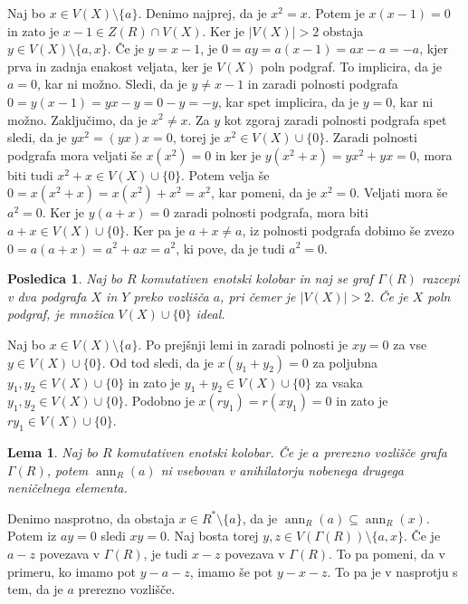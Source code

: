 \documentclass[a4paper, 12pt]{amsart}
\theoremstyle{definition} %
\theoremstyle{plain} %
\newtheorem{lema}[definicija]{Lema}
\newtheorem{posledica}[definicija]{Posledica}
\DeclareMathOperator{\ann}{ann}
\begin{document}
\proof
Naj bo $x\in V(X)\setminus \{a\}$. Denimo najprej, da je $x^2 = x$. Potem je $x(x-1) = 0$ in zato je $x-1\in Z(R) \cap V(X)$. Ker je $|V(X)|> 2$ obstaja $y\in V(X)\setminus \{a,x\}$. Če je $y = x-1$, je $0 = ay = a(x-1) = ax - a = -a$, kjer prva in zadnja enakost veljata, ker je $V(X)$ poln podgraf. To implicira, da je $a=0$, kar ni možno. Sledi, da je $y\neq x-1$ in zaradi polnosti podgrafa $0 = y(x-1) = yx-y = 0-y = -y$, kar spet implicira, da je $y=0$, kar ni možno. Zaključimo, da je $x^2 \neq x$. Za $y$ kot zgoraj zaradi polnosti podgrafa spet sledi, da je $yx^2 = (yx)x = 0$, torej je $x^2 \in V(X)\cup\{0\}$. Zaradi polnosti podgrafa mora veljati še $x(x^2)=0$ in ker je $y(x^2 + x ) = yx^2 + yx =0 $, mora biti tudi $x^2 + x\in V(X) \cup \{0\}$. Potem velja še  $0 = x(x^2 + x) = x(x^2) + x^2 = x^2$, kar pomeni, da je $x^2 = 0$. Veljati mora še $a^2 = 0$. Ker je $y(a+x) = 0 $ zaradi polnosti podgrafa, mora biti $a+x\in V(X) \cup\{0\}$. Ker pa je $a+x \neq a$, iz polnosti podgrafa dobimo še zvezo $0 = a(a+x) = a^2 + ax = a^2$, ki pove, da je tudi $a^2 = 0$.
\endproof

\begin{posledica}
Naj bo $R$ komutativen enotski kolobar in naj se graf $\Gamma(R)$ razcepi v dva podgrafa $X$ in $Y$ preko vozlišča $a$, pri čemer je $|V(X)|>2$. Če je $X$ poln podgraf, je množica $V(X)\cup \{0\}$ ideal.
\end{posledica}

\proof
Naj bo $x\in V(X)\setminus\{a\}$. Po prejšnji lemi in zaradi polnosti je $xy=0$ za vse $y\in V(X)\cup\{0\}$. Od tod sledi, da je $x(y_1 + y_2) = 0$ za poljubna $y_1,y_2 \in V(X)\cup \{0\}$ in zato je $y_1 + y_2 \in V(X) \cup\{0\}$ za vsaka $y_1,y_2\in V(X)\cup\{0\}$. Podobno je $x(ry_1) = r(xy_1 ) =0$ in zato je $ry_1\in V(X) \cup\{0\}$.
\endproof

\begin{lema}
\label{cutVertexMaxAnn}
Naj bo $R$ komutativen enotski kolobar. Če je $a$ prerezno vozlišče grafa $\Gamma(R)$, potem $\ann_R(a)$ ni vsebovan v anihilatorju nobenega drugega neničelnega elementa.
\end{lema}

\proof
Denimo nasprotno, da obstaja $x\in R^*\setminus\{a\}$, da je $\ann_R(a) \subseteq \ann_R(x)$. Potem iz $ay = 0$ sledi $xy = 0$. Naj bosta torej $y,z \in V(\Gamma(R)) \setminus \{a,x\}$. Če je $a-z$ povezava v $\Gamma(R)$, je tudi $x-z$ povezava v $\Gamma(R)$. To pa pomeni, da v primeru, ko imamo pot $y-a-z$, imamo še pot $y-x-z$. To pa je v nasprotju s tem, da je $a$ prerezno vozlišče.
\endproof
\end{document}
